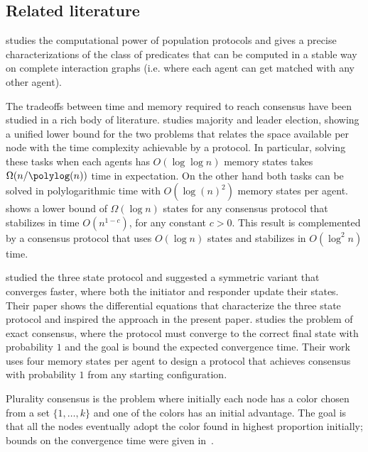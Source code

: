 \documentclass[a4paper,12pt]{article}
\begin{document}
\subsection{Related literature} \label{sec:further_related_work}

\cite{AngluinAER07} studies the computational power of population protocols and gives a precise characterizations of the class of predicates that can be computed in a stable way on complete interaction graphs (i.e. where each agent can get matched with any other agent).

The tradeoffs between time and memory required to reach consensus have been studied in a rich body of literature. \cite{AAEGR17} studies majority and leader election, showing a  unified lower bound for the two problems that relates the space available per node with the time complexity achievable by a protocol. In particular, solving these tasks when each agents has $O(\log \log{n})$ memory states takes $\Omega(n/\polylog(n))$ time in expectation. On the other hand both tasks can be solved in polylogarithmic time with $O(\log(n)^2)$ memory states per agent. \cite{AlistarhAG18} shows a lower bound of $\Omega(\log{n})$ states for any consensus protocol that stabilizes in time $O(n^{1-c})$, for any constant $c > 0$. This result is complemented by a consensus protocol that uses $O(\log{n})$ states and stabilizes in $O(\log^{2}{n})$ time.

\cite{PVV09} studied the three state protocol and suggested a symmetric variant that converges faster, where both the initiator and responder update their states. 
Their paper shows the differential equations that characterize the three state protocol and inspired the approach in the present paper.
\cite{DraiefV12} studies the problem of exact consensus, where the protocol must converge to the correct final state with probability $1$ and the goal is bound the expected convergence time. Their work uses four memory states per agent to design a protocol that achieves consensus with probability $1$ from any starting configuration. %

Plurality consensus is the problem where initially each node has a color chosen from a set $\{1, \ldots, k\}$ and one of the colors has an initial advantage. The goal is that all the nodes eventually adopt the color found in highest proportion initially; bounds on the convergence time were given in~\cite{BecchettiCNPS15,BecchettiCNPST17}.
\end{document}
